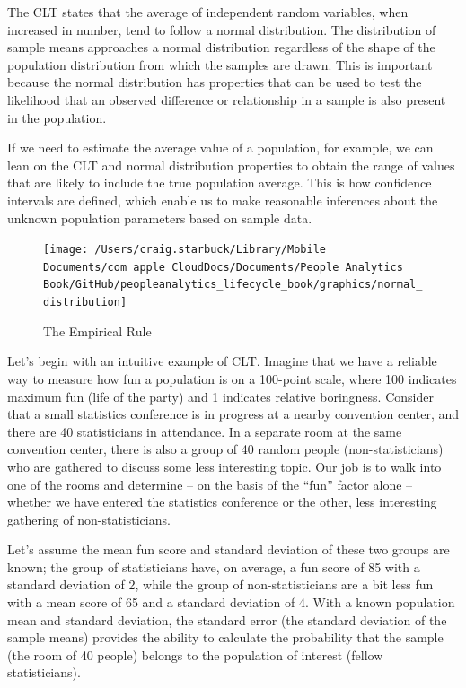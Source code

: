 \documentclass[]{book}
\begin{document}
The CLT states that the average of independent random variables, when increased in number, tend to follow a normal distribution. The distribution of sample means approaches a normal distribution regardless of the shape of the population distribution from which the samples are drawn. This is important because the normal distribution has properties that can be used to test the likelihood that an observed difference or relationship in a sample is also present in the population.

If we need to estimate the average value of a population, for example, we can lean on the CLT and normal distribution properties to obtain the range of values that are likely to include the true population average. This is how confidence intervals are defined, which enable us to make reasonable inferences about the unknown population parameters based on sample data.

\begin{figure}

{\centering \texttt{[image: /Users/craig.starbuck/Library/Mobile Documents/com~apple~CloudDocs/Documents/People Analytics Book/GitHub/peopleanalytics\_lifecycle\_book/graphics/normal\_distribution]} 

}

\caption{The Empirical Rule}\label{fig:unnamed-chunk-9}
\end{figure}

Let's begin with an intuitive example of CLT. Imagine that we have a reliable way to measure how fun a population is on a 100-point scale, where 100 indicates maximum fun (life of the party) and 1 indicates relative boringness. Consider that a small statistics conference is in progress at a nearby convention center, and there are 40 statisticians in attendance. In a separate room at the same convention center, there is also a group of 40 random people (non-statisticians) who are gathered to discuss some less interesting topic. Our job is to walk into one of the rooms and determine -- on the basis of the ``fun'' factor alone -- whether we have entered the statistics conference or the other, less interesting gathering of non-statisticians.

Let's assume the mean fun score and standard deviation of these two groups are known; the group of statisticians have, on average, a fun score of 85 with a standard deviation of 2, while the group of non-statisticians are a bit less fun with a mean score of 65 and a standard deviation of 4. With a known population mean and standard deviation, the standard error (the standard deviation of the sample means) provides the ability to calculate the probability that the sample (the room of 40 people) belongs to the population of interest (fellow statisticians).
\end{document}
